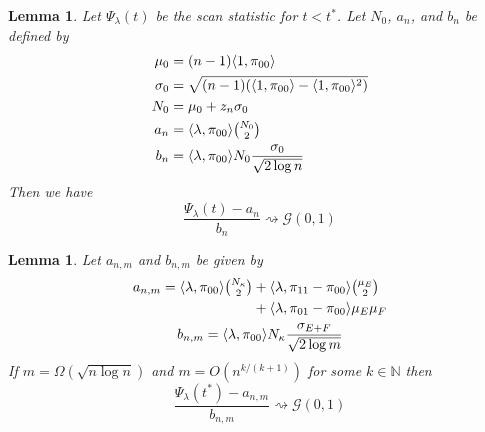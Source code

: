 \documentclass[final]{IEEEtran}
\newtheorem{lemma}[theorem]{Lemma}
\theoremstyle{definition}
\begin{document}
\begin{lemma}
  \label{lem:5}
  Let $\Psi_{\lambda}(t)$ be the scan statistic for $t < t^{*}$. Let
  $N_{0}$, $a_n$, and $b_n$ be defined by
\begin{align*}
   \mu_0 &= (n-1) \langle 1, \pi_{00} \rangle \\
   \sigma_0 &= \sqrt{(n-1) (\langle 1, \pi_{00} \rangle - \langle
     1, \pi_{00} \rangle^2)} \\ 
    N_{0} &= \mu_0 + z_n \sigma_0 \\
    a_n &=  \langle \lambda, \pi_{00} \rangle \tbinom{N_{0}}{2} \\ 
   b_n &= \langle \lambda, \pi_{00} \rangle N_{0} \frac{\sigma_0}{\sqrt{2 \log
     n}}
\end{align*}
Then we have
\begin{equation}
  \frac{\Psi_{\lambda}(t) - a_{n}}{b_n} \rightsquigarrow
  \mathcal{G}(0, 1)
\end{equation}
\end{lemma}%
\begin{lemma}
  \label{lem:6}
  Let $a_{n,m}$ and $b_{n,m}$ be given by
  \begin{gather}
    \label{eq:28}
    \begin{split}
    a_{n,m} =%
\langle \lambda, \pi_{00} \rangle \tbinom{N_\kappa}{2} &+
\langle \lambda, \pi_{11} - \pi_{00} \rangle
\tbinom{\mu_E}{2} \\ &+ \langle \lambda, \pi_{01} - \pi_{00} \rangle \mu_E \mu_F 
    \end{split} \\
    b_{n,m} = \langle \lambda, \pi_{00} \rangle N_\kappa \frac{\sigma_{E + F}}{\sqrt{2
        \log{m}}}
  \end{gather}
  If $m = \Omega(\sqrt{n \log n})$ and $m = O(n^{k/(k+1)})$ for some
  $k \in \mathbb{N}$ then
  \begin{equation}
    \label{eq:29}
    \frac{\Psi_{\lambda}(t^{*}) - a_{n,m}}{b_{n,m}}  \rightsquigarrow
    \mathcal{G}(0,1)  \end{equation}
\end{lemma}
\end{document}
